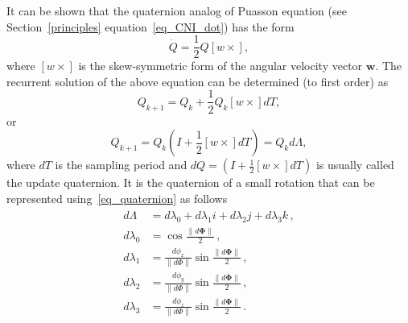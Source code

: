 \documentclass[journal]{IEEEtran}
\begin{document}
It can be shown that the quaternion analog of Puasson equation (see Section~\ref{principles} equation~\eqref{eq_CNI_dot}) has the form
\begin{equation}
    \dot{Q}=\frac{1}{2}Q[w\times],
\end{equation}
where $[w\times]$ is the skew-symmetric form of the angular velocity vector $\boldsymbol{w}$.
The recurrent solution of the above equation can be determined  (to first order) as
\begin{equation}
    Q_{k+1}=Q_{k}+ \frac{1}{2}Q_{k}[w\times] dT,
\end{equation}
or
\begin{equation}
    Q_{k+1}=Q_{k}(I+ \frac{1}{2}[w\times] dT)=Q_{k}d{\Lambda},
    \label{eq_recur}
\end{equation}
where $dT$ is the sampling period and $d{Q}=(I+ \frac{1}{2}[w\times] dT)$ is usually called the update quaternion. It is the quaternion of a small rotation that can be represented using~\eqref{eq_quaternion} as follows
\begin{equation}
         \begin{array}{c}
        \begin{aligned}
        d\Lambda &= d\lambda_0+d\lambda_{1}i+d\lambda_{2}j+d\lambda_{3}k\,,\\
         d\lambda_0 &= \cos\frac{{\|d\mathbf\Phi\|}}{2}\,,   \\
         
         d\lambda_1 &=\frac{{d\phi}_x}{\|d\Phi\|} \sin\frac{{\|d\mathbf\Phi\|}}{2}\,, \\
         
         d\lambda_2 &= \frac{{d\phi}_y}{\|d\Phi\|}\sin\frac{{\|d\mathbf\Phi\|}}{2}\,,\\
         
         d\lambda_3 &= \frac{{d\phi}_z}{\|d\Phi\|}\sin\frac{{\|d\mathbf\Phi\|}}{2}\,. \\
         \end{aligned}
        \end{array}
        \label{eq_delta_phi}
\end{equation}
\end{document}
